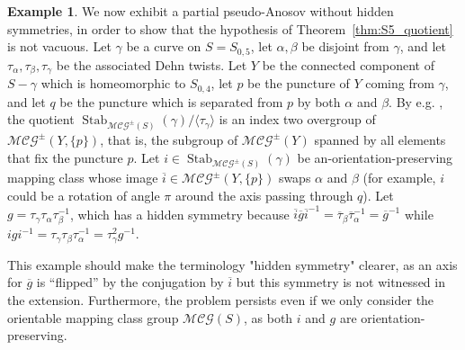 \documentclass[svgnames]{amsart}
\theoremstyle{plain}
\theoremstyle{definition}
\newtheorem{ex}[thm]{Example}
\newcommand{\ov}[1]{\overline{#1}}
\newcommand{\Stab}[2]{\operatorname{Stab}_{#1}(#2)}
\newcommand{\MCG}{\mathcal{MCG}^\pm}
\begin{document}
\begin{ex}\label{ex:symmetry}
We now exhibit a partial pseudo-Anosov without hidden symmetries, in order to show that the hypothesis of Theorem~\ref{thm:S5_quotient} is not vacuous. Let $\gamma$ be a curve on $S=S_{0,5}$, let $\alpha,\beta$ be disjoint from $\gamma$, and let $\tau_\alpha,\tau_\beta,\tau_\gamma$ be the associated Dehn twists. Let $Y$ be the connected component of $S-\gamma$ which is homeomorphic to $S_{0,4}$, let $p$ be the puncture of $Y$ coming from $\gamma$, and let $q$ be the puncture which is separated from $p$ by both $\alpha$ and $\beta$. By e.g. \cite[Proposition 3.19]{FarbMargalit}, the quotient $\Stab{\MCG(S)}{\gamma}/\langle \tau_\gamma\rangle$ is an index two overgroup of $\MCG(Y, \{p\})$, that is, the subgroup of $\MCG(Y)$ spanned by all elements that fix the puncture $p$. Let $i\in\Stab{\MCG(S)}{\gamma}$ be an-orientation-preserving mapping class whose image
$\ov i\in \MCG(Y, \{p\})$ swaps $\alpha$ and $\beta$ (for example, $i$ could be a rotation of angle $\pi$ around the axis passing through $q$). Let $g=\tau_\gamma\tau_\alpha\tau_\beta^{-1}$, which has a hidden symmetry because $\ov i\ov g\ov i^{-1}=\ov \tau_\beta\ov \tau_\alpha^{-1}=\ov g^{-1}$ while $igi^{-1}=\tau_\gamma\tau_\beta\tau_\alpha^{-1}=\tau_\gamma^2g^{-1}$.

This example should make the terminology "hidden symmetry" clearer, as an axis for $\ov g$ is “flipped” by the conjugation by $\ov i$ but this symmetry is not witnessed in the extension. Furthermore, the problem persists even if we only consider the orientable mapping class group $\mathcal{MCG}(S)$, as both $i$ and $g$ are orientation-preserving.
\end{ex}




\end{document}

